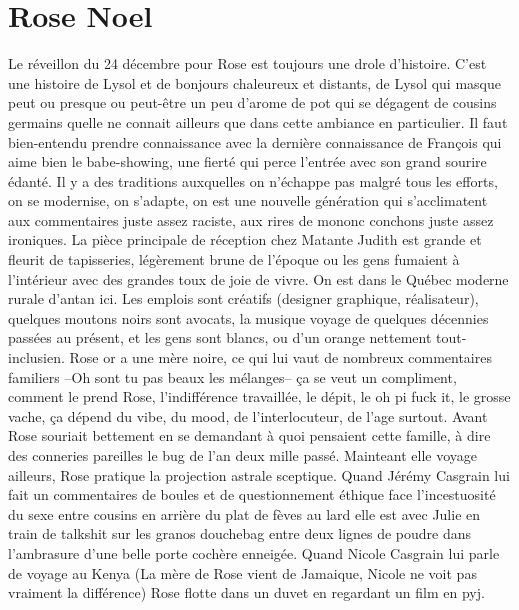 



\section{Rose Noel}

Le réveillon du 24 décembre pour Rose est toujours une drole d'histoire. C'est une
histoire de Lysol et de bonjours chaleureux et distants, de Lysol qui masque peut
ou presque ou peut-être un peu d'arome de pot qui se dégagent de cousins germains
quelle ne connait ailleurs que dans cette ambiance en particulier. Il faut bien-entendu
prendre connaissance avec la dernière connaissance de François qui aime bien le babe-showing,
une fierté qui perce l'entrée avec son grand sourire édanté. Il y a des traditions auxquelles
on n'échappe pas malgré tous les efforts, on se modernise, on s'adapte, on est une nouvelle
génération qui s'acclimatent aux commentaires juste assez raciste, aux rires de mononc conchons
juste assez ironiques. La pièce principale de réception chez Matante Judith est grande et
fleurit de tapisseries, légèrement brune de l'époque ou les gens fumaient à l'intérieur
avec des grandes toux de joie de vivre. On est dans le Québec moderne rurale d'antan ici.
Les emplois sont créatifs (designer graphique, réalisateur), quelques moutons noirs sont 
avocats, la musique voyage de quelques décennies passées au présent, et les gens sont
blancs, ou d'un orange nettement tout-inclusien. Rose or a une mère noire, ce qui lui
vaut de nombreux commentaires familiers --Oh sont tu pas beaux les mélanges-- ça se veut
un compliment, comment le prend Rose, l'indifférence travaillée, le dépit, le oh pi fuck it, 
le grosse vache, ça dépend du vibe, du mood, de l'interlocuteur, de l'age surtout. Avant
Rose souriait bettement en se demandant à quoi pensaient cette famille, à dire des conneries
pareilles le bug de l'an deux mille passé. Mainteant elle voyage ailleurs, Rose pratique
la projection astrale sceptique. Quand Jérémy Casgrain lui fait un commentaires de boules
et de questionnement éthique face l'incestuosité du sexe entre cousins en arrière du plat
de fèves au lard elle est avec Julie en train de talkshit sur les granos douchebag entre
deux lignes de poudre dans l'ambrasure d'une belle porte cochère enneigée. Quand Nicole
Casgrain lui parle de voyage au Kenya (La mère de Rose vient de Jamaique, Nicole ne voit
pas vraiment la différence) Rose flotte dans un duvet en regardant un film en pyj. 





